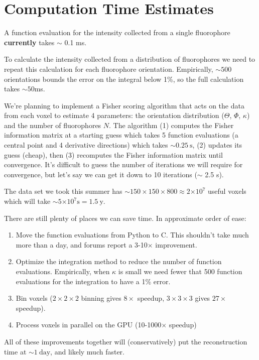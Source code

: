 \documentclass[11pt]{article}
\providecommand{\e}[1]{\ensuremath{\times 10^{#1}}}
\begin{document}
\section{Computation Time Estimates}
A function evaluation for the intensity collected from a single fluorophore
\textbf{currently} takes $\sim$ 0.1 ms.

To calculate the intensity collected from a distribution of fluorophores we need
to repeat this calculation for each fluorophore orientation. Empirically,
$\sim 500$ orientations bounds the error on the integral below 1\%, so the full
calculation takes $\sim 50$ms.

We're planning to implement a Fisher scoring algorithm that acts on the data
from each voxel to estimate 4 parameters: the orientation distribution
($\Theta$, $\Phi$, $\kappa$) and the number of fluorophores $N$. The algorithm
(1) computes the Fisher information matrix at a starting guess which takes 5
function evaluations (a central point and 4 derivative directions) which takes
$\sim 0.25\ \text{s}$, (2) updates its guess (cheap), then (3) recomputes the Fisher
information matrix until convergence. It's difficult to guess the number of
iterations we will require for convergence, but let's say we can get it down to
10 iterations ($\sim$ 2.5 s).

The data set we took this summer has $\sim 150\times 150\times 800 \approx 2\e{7}$
useful voxels which will take $\sim5\e{7} \text{s} = 1.5\ \text{y}$.

There are still plenty of places we can save time. In approximate order of ease:
\begin{enumerate}
\item Move the function evaluations from Python to C. This shouldn't take much
  more than a day, and forums report a 3-10$\times$ improvement.
\item Optimize the integration method to reduce the number of function
  evaluations. Empirically, when $\kappa$ is small we need fewer that 500
  function evaluations for the integration to have a 1\% error.
\item Bin voxels ($2\times2\times2$ binning gives $8\times$ speedup,
  $3\times3\times3$ gives $27\times$ speedup).
\item Process voxels in parallel on the GPU (10-1000$\times$ speedup)
\end{enumerate}

All of these improvements together will (conservatively) put the reconstruction time at $\sim 1\ \text{day}$, and likely much faster.
{}

\end{document}

